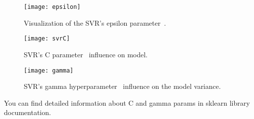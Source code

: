 \begin{figure}[!htb]
	\caption{Visualization of the SVR's epsilon parameter~.}
	\centering
	\label{fig:epsilon}
	\texttt{[image: epsilon]}
\end{figure}
\begin{figure}[!htb]
	\caption{SVR's C parameter~ influence on model.}
	\centering
	\label{fig:svrc}
	\texttt{[image: svrC]}
\end{figure}
\begin{figure}[!htb]
	\caption{SVR's gamma hyperparameter~ influence on the model variance.}
	\centering
	\label{fig:gamma}
	\texttt{[image: gamma]}
\end{figure}
You can find detailed information about C and gamma params in sklearn library documentation\cite{rbf_params}.